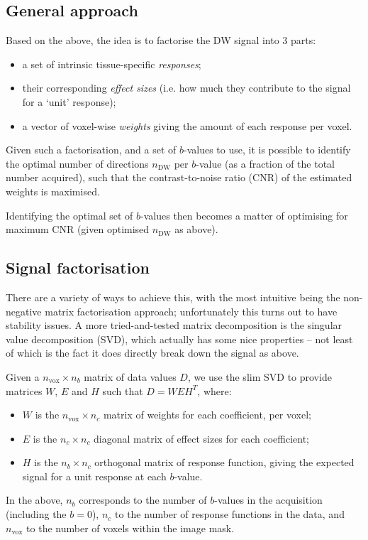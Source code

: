 \documentclass{article}
\newcommand{\nDW}{n_{\textrm{DW}}}
\newcommand{\nvox}{n_{\textrm{vox}}}
\begin{document}
\subsection{General approach}

Based on the above, the idea is to factorise the DW signal into 3 parts: 
\begin{itemize}
\item a set of intrinsic tissue-specific {\em responses};
\item their corresponding {\em effect sizes} (i.e. how much they contribute to the signal for a `unit' response);
\item a vector of voxel-wise {\em weights} giving the amount of each response per voxel.
\end{itemize}

Given such a factorisation, and a set of $b$-values to use, it is possible to
identify the optimal number of directions $\nDW$ per $b$-value (as a fraction of the
total number acquired), such that the contrast-to-noise ratio (CNR) of the
estimated weights is maximised. 

Identifying the optimal set of $b$-values then becomes a matter of optimising
for maximum CNR (given optimised $\nDW$ as above).

\subsection{Signal factorisation}

There are a variety of ways to achieve this, with the most intuitive being the
non-negative matrix factorisation approach; unfortunately this turns out to
have stability issues. A more tried-and-tested matrix decomposition is the
singular value decomposition (SVD), which actually has some nice properties --
not least of which is the fact it does directly break down the signal as above. 

Given a $\nvox \times n_b$ matrix of data values $D$, we use the
slim SVD to provide matrices $W$, $E$ and $H$ such that $D = W E H^T$, where:
\begin{itemize}
\item $W$ is the $\nvox \times n_c$ matrix of weights for each coefficient, per voxel;
\item $E$ is the $n_c \times n_c$ diagonal matrix of effect sizes for each coefficient;
\item $H$ is the $n_b \times n_c$ orthogonal matrix of response function,
giving the expected signal for a unit response at each $b$-value.
\end{itemize}
In the above, $n_b$ corresponds to the number of $b$-values in the acquisition
(including the $b=0$), $n_c$ to the number of response functions in the data,
and $\nvox$ to the number of voxels within the image mask. 
\end{document}
